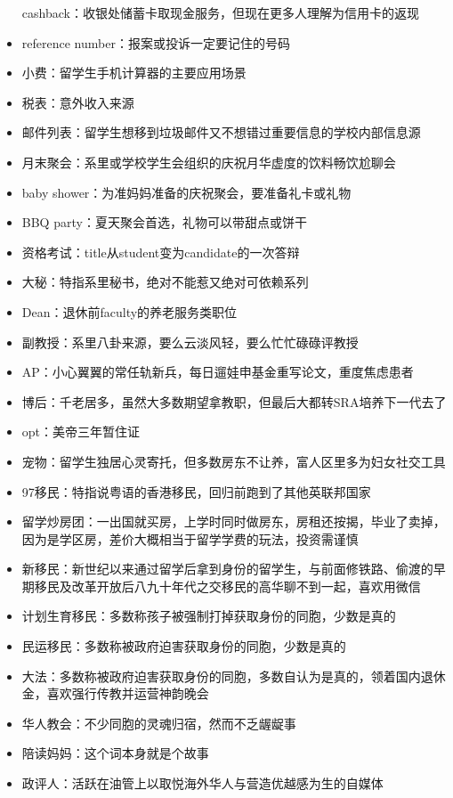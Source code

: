 \documentclass[]{tufte-book}
\begin{document}
\begin{itemize}
  cashback：收银处储蓄卡取现金服务，但现在更多人理解为信用卡的返现
\item
  reference number：报案或投诉一定要记住的号码
\item
  小费：留学生手机计算器的主要应用场景
\item
  税表：意外收入来源
\item
  邮件列表：留学生想移到垃圾邮件又不想错过重要信息的学校内部信息源
\item
  月末聚会：系里或学校学生会组织的庆祝月华虚度的饮料畅饮尬聊会
\item
  baby shower：为准妈妈准备的庆祝聚会，要准备礼卡或礼物
\item
  BBQ party：夏天聚会首选，礼物可以带甜点或饼干
\item
  资格考试：title从student变为candidate的一次答辩
\item
  大秘：特指系里秘书，绝对不能惹又绝对可依赖系列
\item
  Dean：退休前faculty的养老服务类职位
\item
  副教授：系里八卦来源，要么云淡风轻，要么忙忙碌碌评教授
\item
  AP：小心翼翼的常任轨新兵，每日遛娃申基金重写论文，重度焦虑患者
\item
  博后：千老居多，虽然大多数期望拿教职，但最后大都转SRA培养下一代去了
\item
  opt：美帝三年暂住证
\item
  宠物：留学生独居心灵寄托，但多数房东不让养，富人区里多为妇女社交工具
\item
  97移民：特指说粤语的香港移民，回归前跑到了其他英联邦国家
\item
  留学炒房团：一出国就买房，上学时同时做房东，房租还按揭，毕业了卖掉，因为是学区房，差价大概相当于留学学费的玩法，投资需谨慎
\item
  新移民：新世纪以来通过留学后拿到身份的留学生，与前面修铁路、偷渡的早期移民及改革开放后八九十年代之交移民的高华聊不到一起，喜欢用微信
\item
  计划生育移民：多数称孩子被强制打掉获取身份的同胞，少数是真的
\item
  民运移民：多数称被政府迫害获取身份的同胞，少数是真的
\item
  大法：多数称被政府迫害获取身份的同胞，多数自认为是真的，领着国内退休金，喜欢强行传教并运营神韵晚会
\item
  华人教会：不少同胞的灵魂归宿，然而不乏龌龊事
\item
  陪读妈妈：这个词本身就是个故事
\item
  政评人：活跃在油管上以取悦海外华人与营造优越感为生的自媒体

\end{itemize}
\end{document}
